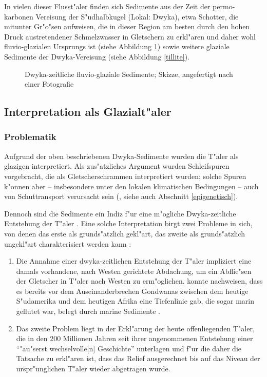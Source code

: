 \documentclass[titlepage,a4paper]{scrartcl}
\begin{document}
In vielen dieser Flusst"aler finden sich Sedimente aus der Zeit der permo-karbonen Vereisung der S"udhalbkugel (Lokal: Dwyka), etwa Schotter, die mitunter Gr"o"sen aufweisen, die in dieser Region am besten durch den hohen Druck austretendener Schmelzwasser in Gletschern zu erkl"aren und daher wohl  fluvio-glazialen Ursprungs ist (siehe Abbildung \ref{flussschotter}) sowie weitere glaziale Sedimente der Dwyka-Vereisung (siehe Abbildung \ref{tillite}).

\begin{figure}
\begin{center}
\end{center}
\caption[Skizze: Dwyka-zeitliche fluvio-glaziale Sedimente]{Dwyka-zeitliche fluvio-glaziale Sedimente; Skizze, angefertigt nach einer Fotografie }
\label{flussschotter}
\end{figure}

\subsection{Interpretation als Glazialt"aler}

\subsubsection{Problematik}

Aufgrund der oben beschriebenen Dwyka-Sedimente wurden die T"aler als glazigen interpretiert. Als zus"atzliches Argument wurden Schleifspuren vorgebracht, die als Gletscherschrammen interpretiert wurden; solche Spuren k"onnen aber -- insbesondere unter den lokalen klimatischen Bedingungen -- auch von Schuttransport verursacht sein (\citealt{BrunotteAndSpoenemann1997}, siehe auch Abschnitt \ref{epigenetisch}).

Dennoch sind die Sedimente ein Indiz f"ur eine m"ogliche Dwyka-zeitliche Entstehung der T"aler \citep{HueserEtAl2003}. Eine solche Interpretation  birgt zwei Probleme in sich, von denen das erste als grunds"atzlich gekl"art, das zweite als grunds"atzlich ungekl"art charakterisiert werden kann \citep{HueserEtAl2003}:

\begin{enumerate}
\item Die Annahme einer dwyka-zeitlichen Entstehung der T"aler impliziert eine damals vorhandene, nach Westen gerichtete Abdachung, um ein Abflie"sen der Gletscher in T"aler nach Westen zu erm"oglichen.  \cite{Stollhoven1999} konnte nachweisen, dass es bereits vor dem Auseinanderbrechen Gondwanas zwischen dem heutige S"udamerika und dem heutigen Afrika eine Tiefenlinie gab, die sogar marin geflutet war, belegt durch marine Sedimente \citep{HueserEtAl2003}.
\item Das zweite Problem liegt in der Erkl"arung der heute offenliegenden T"aler, die in den 200 Millionen Jahren seit ihrer angenommenen Entstehung einer ``"au"serst wechselvolle[n] Geschichte'' \citep{HueserEtAl2003} unterlagen und f"ur die daher die Tatsache zu erkl"aren ist, dass das Relief ausgerechnet bis auf das Niveau der urspr"unglichen T"aler wieder abgetragen wurde.
\end{enumerate}
\end{document}
